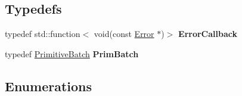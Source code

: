 \subsection*{Typedefs}
\begin{DoxyCompactItemize}
\item 
\mbox{\label{namespacenta_a1f5715ee41c7a9174d2cc404fdb8556a}} 
typedef std\+::function$<$ void(const \hyperlink{structnta_1_1Error}{Error} $\ast$)$>$ {\bfseries Error\+Callback}
\item 
\mbox{\label{namespacenta_acee44e1bbf4f2431ec51a26e231691e5}} 
typedef \hyperlink{classnta_1_1PrimitiveBatch}{Primitive\+Batch} {\bfseries Prim\+Batch}
\end{DoxyCompactItemize}
\subsection*{Enumerations}
